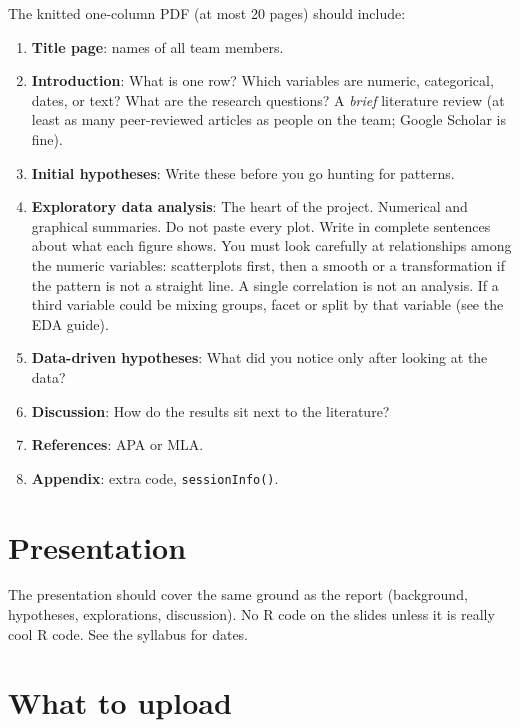 \documentclass[11pt, a4paper]{article}
\begin{document}
The knitted one-column PDF (at most 20 pages) should include:

\begin{enumerate}
    \item \textbf{Title page}: names of all team members.

    \item \textbf{Introduction}: What is one row? Which variables are numeric, categorical, dates, or text? What are the research questions? A \emph{brief} literature review (at least as many peer-reviewed articles as people on the team; Google Scholar is fine).

    \item \textbf{Initial hypotheses}: Write these before you go hunting for patterns.

    \item \textbf{Exploratory data analysis}: The heart of the project. Numerical and graphical summaries. Do not paste every plot. Write in complete sentences about what each figure shows. You must look carefully at relationships among the numeric variables: scatterplots first, then a smooth or a transformation if the pattern is not a straight line. A single correlation is not an analysis. If a third variable could be mixing groups, facet or split by that variable (see the EDA guide).

    \item \textbf{Data-driven hypotheses}: What did you notice only after looking at the data?

    \item \textbf{Discussion}: How do the results sit next to the literature?

    \item \textbf{References}: APA or MLA.

    \item \textbf{Appendix}: extra code, \texttt{sessionInfo()}.
\end{enumerate}

\section*{Presentation}

The presentation should cover the same ground as the report (background, hypotheses, explorations, discussion). No R code on the slides unless it is really cool R code. See the syllabus for dates.

\section*{What to upload}
\end{document}

